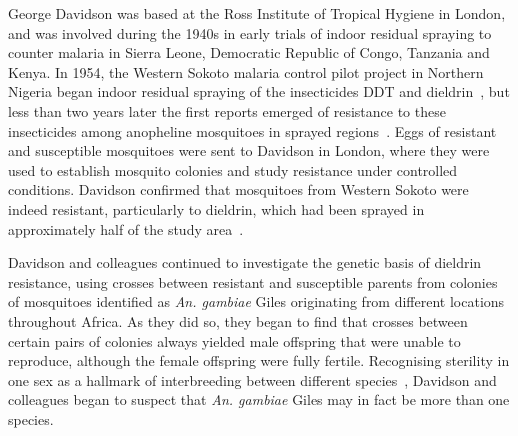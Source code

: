 \begin{refsection}
George Davidson was based at the Ross Institute of Tropical Hygiene in London, and was involved during the 1940s in early trials of indoor residual spraying to counter malaria in Sierra Leone, Democratic Republic of Congo, Tanzania and Kenya.
%
In 1954, the Western Sokoto malaria control pilot project in Northern Nigeria began indoor residual spraying of the insecticides DDT and dieldrin~\parencite{BruceChwatt1959}, but less than two years later the first reports emerged of resistance to these insecticides among anopheline mosquitoes in sprayed regions~\parencite{Elliott1956}.
%
Eggs of resistant and susceptible mosquitoes were sent to Davidson in London, where they were used to establish mosquito colonies and study resistance under controlled conditions.
%
Davidson confirmed that mosquitoes from Western Sokoto were indeed resistant, particularly to dieldrin, which had been sprayed in approximately half of the study area~\parencite{Davidson1956}.

Davidson and colleagues continued to investigate the genetic basis of dieldrin resistance, using crosses between resistant and susceptible parents from colonies of mosquitoes identified as \textit{An. gambiae} Giles originating from different locations throughout Africa.
%
As they did so, they began to find that crosses between certain pairs of colonies always yielded male offspring that were unable to reproduce, although the female offspring were fully fertile.
%
Recognising sterility in one sex as a hallmark of interbreeding between different species~\parencite{Haldane1922}, Davidson and colleagues began to suspect that \textit{An. gambiae} Giles may in fact be more than one species.



\end{refsection}
